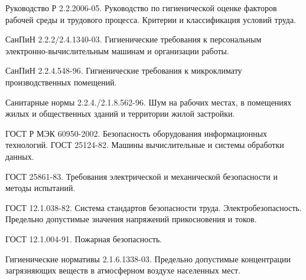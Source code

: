    Руководство Р 2.2.2006-05.
                                    Руководство по гигиенической оценке факторов
                                    рабочей среды и трудового процесса. Критерии
                                    и классификация условий труда.

  СанПиН 2.2.2/2.4.1340-03.
                                            Гигиенические требования к персональным
                                            электронно-вычислительным машинам и
                                            организации работы.

   СанПиН 2.2.4.548-96.
                                        Гигиенические требования к микроклимату
                                        производственных помещений.

 Санитарные нормы 2.2.4./2.1.8.562-96.
                                                    Шум на рабочих местах, в помещениях
                                                    жилых и общественных зданий и
                                                    территории жилой застройки.

   ГОСТ Р МЭК 60950-2002.
                                    Безопасность оборудования информационных
                                    технологий.
 ГОСТ 25124-82.
                                Машины вычислительные и системы обработки данных.

 ГОСТ 25861-83.
                                Требования электрической и механической
                                безопасности и методы испытаний.

  ГОСТ 12.1.038-82.
                                    Система стандартов безопасности труда.
                                    Электробезопасность. Предельно допустимые
                                    значения напряжений прикосновения и токов.

  ГОСТ 12.1.004-91.
                                    Пожарная безопасность.

    Гигиенические нормативы 2.1.6.1338-03.
                                                Предельно допустимые концентрации загрязняющих
                                                веществ в атмосферном воздухе населенных мест.
